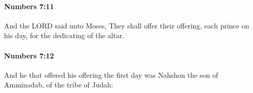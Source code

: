 		\paragraph{Numbers 7:11} %
			\label{NUMBERS-7-11}

			And the LORD said unto Moses, They shall offer their offering, each prince on his day, for the dedicating of the altar.


		\paragraph{Numbers 7:12} %
			\label{NUMBERS-7-12}

			And he that offered his offering the first day was Nahshon the son of Amminadab, of the tribe of Judah:


